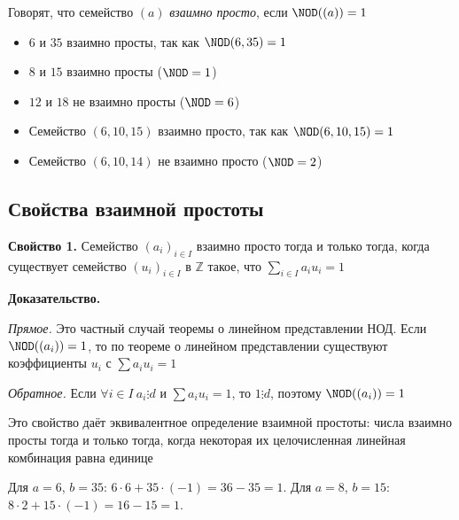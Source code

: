\documentclass[a4paper,12pt]{article}
\theoremstyle{definition}
\theoremstyle{plain}
\theoremstyle{remark}
\begin{document}
	Говорят, что семейство $(a)$ \textit{взаимно просто}, если $\NOD((a)) = 1$
	
	\begin{tcolorbox}[colback=blue!5, colframe=blue!40!black, title=Примеры]
	\begin{itemize}
	\item $6$ и $35$ взаимно просты, так как $\NOD(6,35)=1$
	\item $8$ и $15$ взаимно просты ($\NOD=1$)
	\item $12$ и $18$ не взаимно просты ($\NOD=6$)
	\item Семейство $(6, 10, 15)$ взаимно просто, так как $\NOD(6,10,15)=1$
	\item Семейство $(6, 10, 14)$ не взаимно просто ($\NOD=2$)
	\end{itemize}
	\end{tcolorbox}
	
	\subsection{Свойства взаимной простоты}
	
	\noindent \textbf{Свойство 1.}
	Семейство $(a_i)_{i \in I}$ взаимно просто тогда и только тогда, когда существует семейство $(u_i)_{i \in I}$ в $\mathbb{Z}$ такое, что $\sum_{i \in I} a_i u_i = 1$
	
	\medskip
	\noindent \textbf{Доказательство.}
	
	\textit{Прямое.} Это частный случай теоремы о линейном представлении НОД. Если $\NOD((a_i)) = 1$, то по теореме о линейном представлении существуют коэффициенты $u_i$ с $\sum a_i u_i = 1$
	
	\textit{Обратное.} Если $\forall i \in I \ a_i \vdots d$ и $\sum a_i u_i = 1$, то $1 \vdots d$, поэтому $\NOD((a_i)) = 1$
	
	\begin{tcolorbox}[colback=green!5, colframe=green!50!black, title=Пояснение]
	Это свойство даёт эквивалентное определение взаимной простоты: числа взаимно просты тогда и только тогда, когда некоторая их целочисленная линейная комбинация равна единице
	\end{tcolorbox}
	
	\begin{tcolorbox}[colback=gray!5, colframe=gray!50, title=Пример]
	Для $a=6$, $b=35$: $6 \cdot 6 + 35 \cdot (-1) = 36 - 35 = 1$.
	Для $a=8$, $b=15$: $8 \cdot 2 + 15 \cdot (-1) = 16 - 15 = 1$.
	\end{tcolorbox}
	
\end{document}
